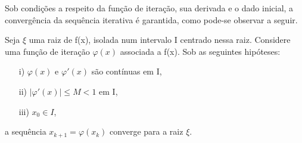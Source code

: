 Sob condições a respeito da função de iteração, sua derivada e o dado inicial, a convergência da sequência iterativa é garantida, como pode-se observar a seguir.
\begin{teo}
    Seja $\xi$ uma raiz de f(x), isolada num intervalo I centrado nessa raiz. Considere uma função de iteração $\varphi(x)$ associada a f(x). Sob as seguintes hipóteses:
    \begin{itemize}\label{teoMPF}
        \item[i)] $\varphi(x)$ e $\varphi'(x)$ são contínuas em I,
        \item [ii)] $|\varphi'(x)| \leq M < 1$ em I,
        \item [iii)] $x_0 \in I$,
    \end{itemize}
    a sequência $x_{k+1} = \varphi(x_k)$ converge para a raiz $\xi$. 
\end{teo}
